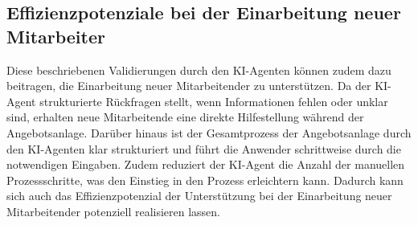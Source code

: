 \subsection{Effizienzpotenziale bei der Einarbeitung neuer Mitarbeiter}

Diese beschriebenen Validierungen durch den \ac{KI}-Agenten können zudem dazu beitragen, die Einarbeitung neuer Mitarbeitender zu unterstützen. Da der \ac{KI}-Agent strukturierte Rückfragen stellt, wenn Informationen fehlen oder unklar sind, erhalten neue Mitarbeitende eine direkte Hilfestellung während der Angebotsanlage. Darüber hinaus ist der Gesamtprozess der Angebotsanlage durch den \ac{KI}-Agenten klar strukturiert und führt die Anwender schrittweise durch die notwendigen Eingaben. Zudem reduziert der \ac{KI}-Agent die Anzahl der manuellen Prozessschritte, was den Einstieg in den Prozess erleichtern kann. Dadurch kann sich auch das Effizienzpotenzial der Unterstützung bei der Einarbeitung neuer Mitarbeitender potenziell realisieren lassen.
